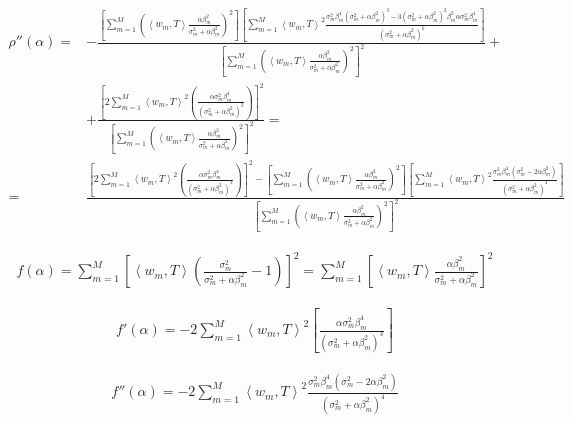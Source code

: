 \documentclass[a4paper,10pt]{article}
\theoremstyle{plain}
\theoremstyle{definition}
\theoremstyle{remark}
\newcommand{\pa}[1]{\left(#1\right)}
\newcommand{\ang}[1]{\left<#1\right>}
\newcommand{\bra}[1]{\left[#1\right]}
\begin{document}
\begin{align*}
  \rho '' (\alpha) = & - \frac{ \bra{\sum _{m=1} ^M \pa{ \ang{w_m, T}
        \frac{\alpha \beta _m ^2}{ \sigma _m ^2 + \alpha \beta _m ^2 }
      } ^2} \bra{ \sum _{m=1} ^M \ang{w_m, T}^2 \frac{\sigma _m ^2
        \beta _m ^4 \pa{ \sigma _m ^2 + \alpha \beta _m ^2 } ^3 -3
        \pa{ \sigma _m ^2 + \alpha \beta _m ^2} ^2 \beta_m ^2 \alpha
        \sigma _m ^2 \beta _m ^4 }{\pa{ \sigma _m ^2 + \alpha \beta _m
          ^2 }^6} }}{\bra{\sum _{m=1} ^M \pa{
        \ang{w_m, T} \frac{\alpha \beta _m ^2}{ \sigma _m ^2 + \alpha
          \beta _m ^2 } } ^2} ^2} + \\
  & + \frac{\bra{2\sum _{m=1} ^M \ang{w_m, T}^2 \pa{
        \frac{\alpha \sigma _m ^2 \beta _m ^4}{\pa{\sigma _m ^2 +
            \alpha \beta_m ^2}^3} }}^2 } {\bra{\sum _{m=1} ^M \pa{
        \ang{w_m, T} \frac{\alpha \beta _m ^2}{ \sigma _m ^2 + \alpha
          \beta _m ^2 } } ^2} ^2 } = \\
  = & \frac{ \bra{2\sum _{m=1} ^M \ang{w_m, T}^2 \pa{
        \frac{\alpha \sigma _m ^2 \beta _m ^4}{\pa{\sigma _m ^2 +
            \alpha \beta_m ^2}^3} }}^2 - \bra{\sum _{m=1} ^M \pa{ \ang{w_m, T}
        \frac{\alpha \beta _m ^2}{ \sigma _m ^2 + \alpha \beta _m ^2 }
      } ^2} \bra{ \sum _{m=1} ^M \ang{w_m, T}^2 \frac{\sigma _m ^2
        \beta _m ^4 \pa{ \sigma _m ^2 -2 \alpha \beta _m ^2  }
        }{\pa{ \sigma _m ^2 + \alpha \beta _m
          ^2 }^4} }}{\bra{\sum _{m=1} ^M \pa{
        \ang{w_m, T} \frac{\alpha \beta _m ^2}{ \sigma _m ^2 + \alpha
          \beta _m ^2 } } ^2} ^2}
\end{align*}

\begin{align*}
  f(\alpha) = \sum _{m=1} ^M \bra{ \ang{w_m, T} \pa{ \frac{\sigma _m
        ^2}{ \sigma _m ^2 + \alpha \beta _m ^2 } - 1 } } ^2 =  \sum
  _{m=1} ^M \bra{ \ang{w_m, T} \frac{\alpha \beta _m ^2}{ \sigma _m ^2
        + \alpha \beta _m ^2 }  } ^2
\end{align*}

\begin{align*}
  f ' (\alpha) = - 2 \sum _{m=1} ^M \ang{w_m, T}^2 \bra{ \frac{\alpha
      \sigma _m ^2 \beta _m ^4}{\pa{\sigma _m ^2 + \alpha \beta_m
        ^2}^3} }
\end{align*}

\begin{align*}
  f '' (\alpha) = -2 \sum _{m=1} ^M \ang{w_m, T}^2 \frac{\sigma _m ^2
        \beta _m ^4 \pa{ \sigma _m ^2 -2 \alpha \beta _m ^2  }
        }{\pa{ \sigma _m ^2 + \alpha \beta _m
          ^2 }^4}
\end{align*}
\end{document}
